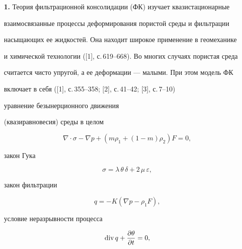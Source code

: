 




\maketitle


\label{begin}





{\bf 1.} Теория фильтрационной консолидации (ФК) изучает квазистационарные


взаимосвязанные процессы деформирования пористой среды и фильтрации


насыщающих ее жидкостей. Она находит широкое применение в геомеханике


и химической технологии ([1], с.\,619--668). Во многих случаях пористая среда


считается чисто упругой, а ее деформации --- малыми. При этом модель ФК


включает в себя ([1], с.\,355--358; [2], с.\,41--42; [3], с.\,7--10)


уравнение безынерционного движения


(квазиравновесия) среды в целом


\begin{equation}


\nabla\cdot\sigma- \nabla p+(m\rho_1 + (1-m) \rho_2) F = 0,


\end{equation}


закон Гука


\begin{equation}


\sigma = \lambda \,\theta \,\delta + 2 \,\mu \,\varepsilon,


\end{equation}


закон фильтрации


\begin{equation}


q = -K(\nabla p - \rho_1 F),


\end{equation}


условие неразрывности процесса


\begin{equation}


\Div q + \frac{\partial\theta}{\partial t} = 0,


\end{equation}


